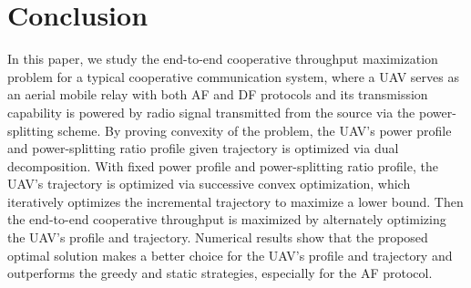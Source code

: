 \documentclass[12pt, draftclsnofoot, onecolumn]{IEEEtran}
\begin{document}
%





\section{Conclusion}
In this paper, we study the end-to-end cooperative throughput maximization problem for a typical cooperative communication system, where a UAV serves as an aerial mobile relay with both AF and DF protocols and its transmission capability is powered by radio signal transmitted from the source via the power-splitting scheme. By proving convexity of the problem, the UAV's power profile and power-splitting ratio profile given trajectory is optimized via dual decomposition. With fixed  power profile and power-splitting ratio profile, the UAV's trajectory is optimized via successive convex optimization, which iteratively optimizes the incremental trajectory to maximize a lower bound. Then the end-to-end cooperative throughput is maximized by alternately optimizing the UAV's profile and trajectory. Numerical results show that the proposed optimal solution makes a better choice for the UAV's profile and trajectory and outperforms the greedy and static strategies, especially for the AF protocol.
\end{document}
